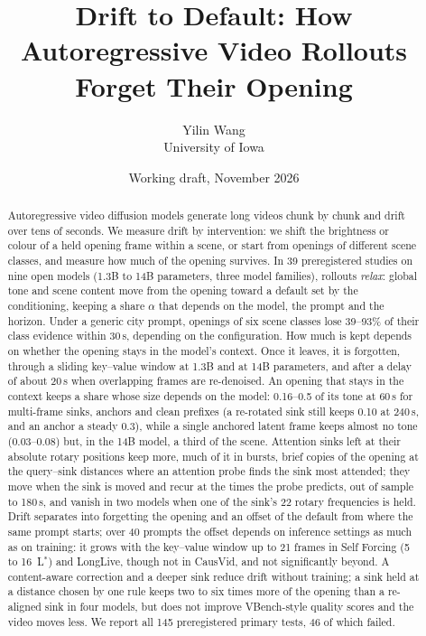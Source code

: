 \documentclass[10pt]{article}
\title{Drift to Default: How Autoregressive Video Rollouts\\ Forget Their Opening}
\author{Yilin Wang\\University of Iowa}
\date{Working draft, November 2026}
\newcommand{\Lstar}{L$^{*}$}
\begin{document}
\maketitle

\begin{abstract}
Autoregressive video diffusion models generate long videos chunk by chunk and drift over tens of seconds. We measure
drift by intervention: we shift the brightness or colour of a held opening frame within a scene, or start from
openings of different scene classes, and measure how much of the opening survives. In 39 preregistered studies
on nine open models (1.3B to 14B parameters, three model families), rollouts \emph{relax}: global tone and scene
content move from the opening toward a default set by the conditioning, keeping a share $\alpha$ that depends on the
model, the prompt and the horizon. Under a generic city prompt, openings of six scene classes lose 39--93\% of their
class evidence within 30\,s, depending on the configuration. How much is kept depends on whether the opening stays in the model's context. Once it
leaves, it is forgotten, through a sliding key--value window at 1.3B and at 14B parameters, and after a delay of about
20\,s when overlapping frames are re-denoised. An opening that stays in the context keeps a share whose size depends on
the model: 0.16--0.5 of its tone at 60\,s for multi-frame sinks, anchors and clean prefixes (a re-rotated sink
still keeps 0.10 at 240\,s, and an anchor a steady 0.3), while a single anchored latent frame keeps almost no tone (0.03--0.08) but, in the 14B model, a third of the
scene. Attention sinks left at their absolute rotary
positions keep more, much of it in bursts, brief copies of the opening at the query--sink distances where an
attention probe finds the sink most attended; they move when the sink is moved and recur at the times the probe
predicts, out of sample to 180\,s, and vanish in two models when one of the sink's 22 rotary frequencies is held. Drift separates into forgetting the opening and an offset of the default from
where the same prompt starts; over 40 prompts the offset depends on inference settings as much as on training: it grows
with the key--value window up to 21 frames in Self Forcing (5 to 16~\Lstar) and LongLive, though not in CausVid,
and not significantly beyond. A
content-aware correction and a deeper sink reduce drift without training; a sink held at a distance chosen by one rule
keeps two to six times more of the opening than a re-aligned sink in four models, but does not improve VBench-style
quality scores and the video moves less. We report all 145 preregistered primary tests, 46 of which failed.
\end{abstract}
\end{document}
